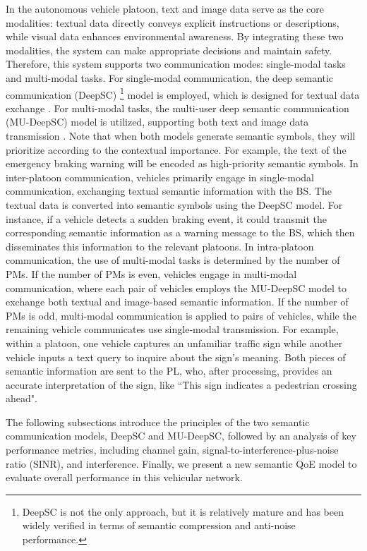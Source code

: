 \documentclass[10pt, lettersize,journal]{IEEEtran}
\begin{document}
	In the autonomous vehicle platoon, text and image data serve as the core modalities: textual data directly conveys explicit instructions or descriptions, while visual data enhances environmental awareness. By integrating these two modalities, the system can make appropriate decisions and maintain safety. Therefore, this system supports two communication modes: single-modal tasks and multi-modal tasks. For single-modal communication, the deep semantic communication (DeepSC) \footnote{DeepSC is not the only approach, but it is relatively mature and has been widely verified in terms of semantic compression and anti-noise performance.} model is employed, which is designed for textual data exchange \cite{9398576}. For multi-modal tasks, the multi-user deep semantic communication (MU-DeepSC) model is utilized, supporting both text and image data transmission \cite{9653664}. Note that when both models generate semantic symbols, they will prioritize according to the contextual importance. For example, the text of the emergency braking warning will be encoded as high-priority semantic symbols.
	In inter-platoon communication, vehicles primarily engage in single-modal communication, exchanging textual semantic information with the BS. The textual data is converted into semantic symbols using the DeepSC model. For instance, if a vehicle detects a sudden braking event, it could transmit the corresponding semantic information as a warning message to the BS, which then disseminates this information to the relevant platoons.
	In intra-platoon communication, the use of multi-modal tasks is determined by the number of PMs. If the number of PMs is even, vehicles engage in multi-modal communication, where each pair of vehicles employs the MU-DeepSC model to exchange both textual and image-based semantic information. If the number of PMs is odd, multi-modal communication is applied to pairs of vehicles, while the remaining vehicle communicates use single-modal transmission.
	For example, within a platoon, one vehicle captures an unfamiliar traffic sign while another vehicle inputs a text query to inquire about the sign's meaning. Both pieces of semantic information are sent to the PL, who, after processing, provides an accurate interpretation of the sign, like ``This sign indicates a pedestrian crossing ahead".
	
	The following subsections introduce the principles of the two semantic communication models, DeepSC and MU-DeepSC, followed by an analysis of key performance metrics, including channel gain, signal-to-interference-plus-noise ratio (SINR), and interference. Finally, we present a new semantic QoE model to evaluate overall performance in this vehicular network.	
	
\end{document}
